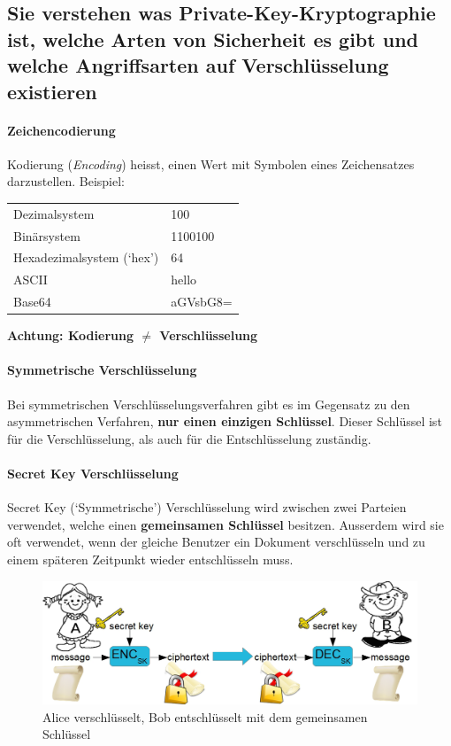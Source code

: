 \documentclass[10pt,a4paper]{article}
\begin{document}
\subsection*{Sie verstehen was Private-Key-Kryptographie ist, welche Arten von Sicherheit es gibt und welche Angriffsarten auf Verschlüsselung existieren}
\paragraph*{Zeichencodierung}Kodierung (\textsl{Encoding}) heisst, einen Wert mit Symbolen eines Zeichensatzes darzustellen. Beispiel:\newline %
\begin{tabular}{|ll|}
    \hline
        Dezimalsystem & 100\\
        Binärsystem & 1100100\\
        Hexadezimalsystem (`hex') & 64\\
        ASCII & hello\\
        Base64 & aGVsbG8=\\
    \hline
\end{tabular}
{\color{red}\textbf{Achtung: Kodierung $\neq$ Verschlüsselung}}

\paragraph*{Symmetrische Verschlüsselung}Bei symmetrischen Verschlüsselungsverfahren gibt es im Gegensatz zu den asymmetrischen Verfahren, \textbf{nur einen einzigen Schlüssel}. Dieser Schlüssel ist für die Verschlüsselung, als auch für die Entschlüsselung zuständig.

\paragraph*{Secret Key Verschlüsselung}Secret Key (`Symmetrische') Verschlüsselung wird zwischen zwei Parteien verwendet, welche einen \textbf{gemeinsamen Schlüssel} besitzen. Ausserdem wird sie oft verwendet, wenn der gleiche Benutzer ein Dokument verschlüsseln und zu einem späteren Zeitpunkt wieder entschlüsseln muss.
\begin{figure}[ht]
    \begin{center}
    \includegraphics[width=14cm]{images/secretkey.png}
    \caption{Alice verschlüsselt, Bob entschlüsselt mit dem gemeinsamen Schlüssel}
    \label{secretkey}
    \end{center}
\end{figure}
\end{document}
